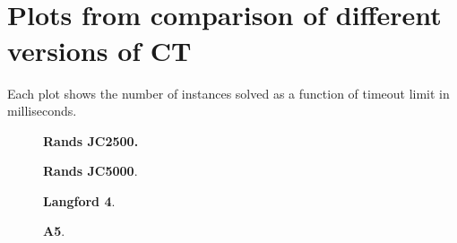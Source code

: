 \documentclass[a4paper,11pt]{article}
\newcommand{\Chapref}[1]{Section~\ref{#1}}
\numberwithin{equation}{section}
\begin{document}


\newpage
\appendix
\section{\\Plots from comparison of different versions of CT}
\label{app:compare-ct}

Each plot shows the number of instances solved as a function
of timeout limit in milliseconds.


\begin{figure}[H]
  \begin{minipage}[b][8cm][s]{0.45\textwidth}
    \centering
    \vfill
    \begin{tikzpicture}[scale=0.9]
      
    \end{tikzpicture}
    \vfill
    \caption{\textbf{Rands JC2500.} }
    \vspace{\baselineskip}
  \end{minipage}\qquad
  \begin{minipage}[b][8cm][s]{0.45\textwidth}
    \centering
    \vfill
    \begin{tikzpicture}[scale=0.9]
      
    \end{tikzpicture}
    \vfill
    \caption{\textbf{Rands JC5000}. }
    \vspace{\baselineskip}
  \end{minipage}\qquad
\end{figure}

\begin{figure}
  \begin{minipage}[b][8cm][s]{0.45\textwidth}
    \centering
    \vfill
    \begin{tikzpicture}[scale=0.9]
      
    \end{tikzpicture}
    \vfill
    \caption{\textbf{Langford 4}.}
    \vspace{\baselineskip}
  \end{minipage}\qquad
  \begin{minipage}[b][8cm][s]{0.45\textwidth}
    \centering
    \vfill
    \begin{tikzpicture}[scale=0.9]
      
    \end{tikzpicture}
    \vfill
    \caption{\textbf{A5}.}
    \vspace{\baselineskip}
  \end{minipage}\qquad

\end{figure}
\end{document}
